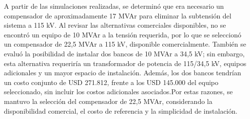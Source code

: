 A partir de las simulaciones realizadas, se determinó que era necesario un compensador de aproximadamente 17 MVAr para eliminar la subtensión del sistema a 115 kV. Al revisar las alternativas comerciales disponibles, no se encontró un equipo de 10 MVAr a la tensión requerida, por lo que se seleccionó un compensador de 22,5 MVAr a 115 kV, disponible comercialmente. \newline También se evaluó la posibilidad de instalar dos bancos de 10 MVAr a 34,5 kV; sin embargo, esta alternativa requeriría un transformador de potencia de 115/34,5 kV, equipos adicionales y un mayor espacio de instalación. Además, los dos bancos tendrían un costo conjunto de USD 271.812, frente a los USD 145.000 del equipo seleccionado, sin incluir los costos adicionales asociados.\newline Por estas razones, se mantuvo la selección del compensador de 22,5 MVAr, considerando la disponibilidad comercial, el costo de referencia y la simplicidad de instalación.
